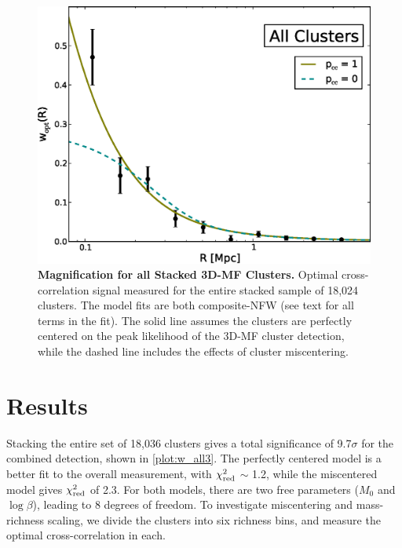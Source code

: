 \begin{figure}
\begin{center}
\includegraphics[scale=0.7]{plots_ch3/wopt_allClusters_U.eps}
\caption[Magnification for all Stacked \ac{3D-MF} Clusters]{{\bf Magnification for all Stacked \ac{3D-MF} Clusters.} Optimal cross-correlation signal measured for the entire stacked sample of 18,024 clusters. The model fits are both composite-\ac{NFW} (see text for all terms in the fit). The solid line assumes the clusters are perfectly centered on the peak likelihood of the \ac{3D-MF} cluster detection, while the dashed line includes the effects of cluster miscentering.}
\label{plot:w_all3}
\end{center}
\end{figure}


\section{Results}
\label{sec:results3}

Stacking the entire set of 18,036 clusters gives a total significance of 9.7$\sigma$ for the combined detection, shown in \autoref{plot:w_all3}. The perfectly centered model is a better fit to the overall measurement, with $\chi^2_{\rm red}$ $\sim$ 1.2, while the miscentered model gives $\chi^2_{\rm red}$ of 2.3. For both models, there are two free parameters ($M_0$ and $\log\beta$), leading to 8 degrees of freedom. To investigate miscentering and mass-richness scaling, we divide the clusters into six richness bins, and measure the optimal cross-correlation in each. 

